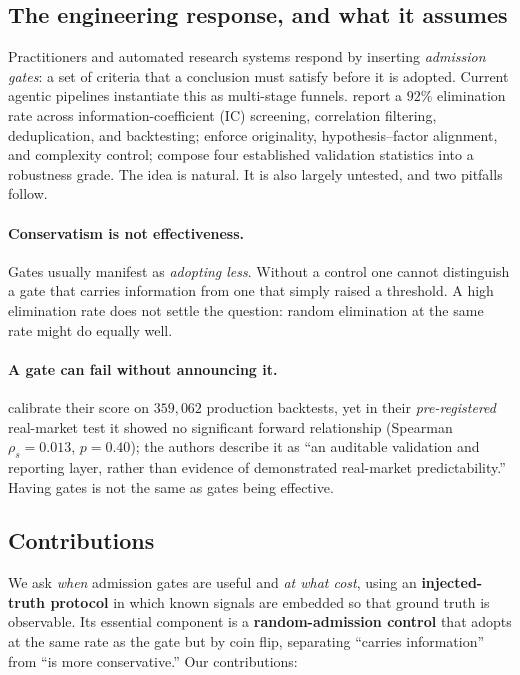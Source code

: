 \documentclass[11pt]{article}
\begin{document}
\subsection{The engineering response, and what it assumes}

Practitioners and automated research systems respond by inserting \emph{admission gates}: a set
of criteria that a conclusion must satisfy before it is adopted. Current agentic pipelines
instantiate this as multi-stage funnels. \citet{factorMiner} report a $92\%$ elimination rate
across information-coefficient (IC) screening, correlation filtering, deduplication, and backtesting;
\citet{alphaagent} enforce originality, hypothesis--factor alignment, and complexity control;
\citet{minerva} compose four established validation statistics into a robustness grade. The
idea is natural. It is also largely untested, and two pitfalls follow.

\paragraph{Conservatism is not effectiveness.} Gates usually manifest as \emph{adopting less}.
Without a control one cannot distinguish a gate that carries information from one that simply
raised a threshold. A high elimination rate does not settle the question: random elimination at
the same rate might do equally well.

\paragraph{A gate can fail without announcing it.} \citet{minerva} calibrate their score on
$359{,}062$ production backtests, yet in their \emph{pre-registered} real-market test it showed
no significant forward relationship (Spearman $\rho_s=0.013$, $p=0.40$); the authors describe it
as ``an auditable validation and reporting layer, rather than evidence of demonstrated
real-market predictability.'' Having gates is not the same as gates being effective.

\subsection{Contributions}

We ask \emph{when} admission gates are useful and \emph{at what cost}, using an
\textbf{injected-truth protocol} in which known signals are embedded so that ground truth is
observable. Its essential component is a \textbf{random-admission control} that adopts at the
same rate as the gate but by coin flip, separating ``carries information'' from ``is more
conservative.'' Our contributions:
\end{document}
